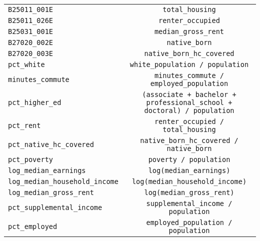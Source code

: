 \begin{table}[tbh]
\begin{tabular}{lc}
\texttt{B25011\_001E}                   &                                                         \texttt{total\_housing} \\
\texttt{B25011\_026E}                   &                                                       \texttt{renter\_occupied} \\
\texttt{B25031\_001E}                   &                                                    \texttt{median\_gross\_rent} \\
\texttt{B27020\_002E}                   &                                                           \texttt{native\_born} \\
\texttt{B27020\_003E}                   &                                              \texttt{native\_born\_hc\_covered} \\
\texttt{pct\_white}                     &                                         \texttt{white\_population / population} \\
\texttt{minutes\_commute}               &                                \texttt{minutes\_commute / employed\_population} \\
\texttt{pct\_higher\_ed}                &  \texttt{(associate + bachelor + professional\_school + doctoral) / population} \\
\texttt{pct\_rent}                      &                                      \texttt{renter\_occupied / total\_housing} \\
\texttt{pct\_native\_hc\_covered}       &                               \texttt{native\_born\_hc\_covered / native\_born} \\
\texttt{pct\_poverty}                   &                                                   \texttt{poverty / population} \\
\texttt{log\_median\_earnings}          &                                                  \texttt{log(median\_earnings)} \\
\texttt{log\_median\_household\_income} &                                         \texttt{log(median\_household\_income)} \\
\texttt{log\_median\_gross\_rent}       &                                               \texttt{log(median\_gross\_rent)} \\
\texttt{pct\_supplemental\_income}      &                                      \texttt{supplemental\_income / population} \\
\texttt{pct\_employed}                  &                                      \texttt{employed\_population / population} \\
\bottomrule
\end{tabular}

        \end{table}